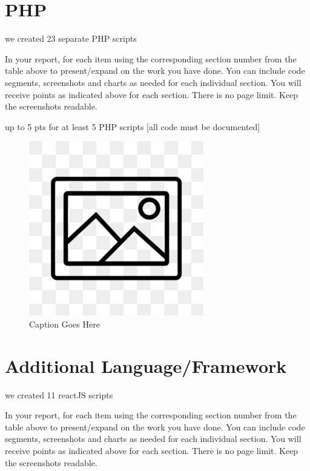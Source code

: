 \documentclass[12pt, letterpaper]{article}
\begin{document}
 \newpage

\section{PHP}
we created 23 separate PHP scripts
	
In your report, for each item using the corresponding section number from the table above to present/expand on the work you have done. You can include code segments, screenshots and charts as needed for each individual section. You will receive points as indicated above for each section. There is no page limit. Keep the screenshots readable.

up to 5 pts for at least 5 PHP scripts [all code must be documented]

\begin{figure}[htbp]
	\centering
	\includegraphics[width=3in]{images/placeholder.jpg}
	\caption{Caption Goes Here}
 \end{figure}

 \newpage

\section{Additional Language/Framework}
we created 11 reactJS scripts

In your report, for each item using the corresponding section number from the table above to present/expand on the work you have done. You can include code segments, screenshots and charts as needed for each individual section. You will receive points as indicated above for each section. There is no page limit. Keep the screenshots readable.
\end{document}
